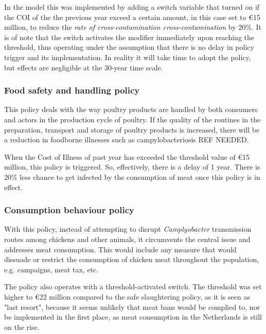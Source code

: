 In the model this was implemented by adding a switch variable that turned on if the COI of the the previous year exceed a certain amount, in this case set to \euro 15 million, to reduce the \textit{rate of cross-contamination cross-contamination} by 20\%. It is of note that the switch activates the modifier immediately upon reaching the threshold, thus operating under the assumption that there is no delay in policy trigger and its implementation. In reality it will take time to adopt the policy, but effects are negligible at the 30-year time scale.

\subsubsection{Food safety and handling policy}
This policy deals with the way poultry products are handled by both consumers and actors in the production cycle of poultry. If the quality of the routines in the preparation, transport and storage of poultry products is increased, there will be a reduction in foodborne illnesses such as campylobacteriosis REF NEEDED.

When the Cost of Illness of past year has exceeded the threshold value of \euro 15 million, this policy is triggered. So, effectively, there is a delay of 1 year. There is 20\% less chance to get infected by the consumption of meat once this policy is in effect.

\subsubsection{Consumption behaviour policy}
With this policy, instead of attempting to disrupt \textit{Camplyobacter} transmission routes among chickens and other animals, it circumvents the central issue and addresses meat consumption. This would include any measure that would dissuade or restrict the consumption of chicken meat throughout the population, e.g. campaigns, meat tax, etc.

The policy also operates with a threshold-activated switch. The threshold was set higher to \euro 22 million compared to the safe slaughtering policy, as it is seen as "last resort", because it seems unlikely that meat bans would be complied to, nor be implemented in the first place, as meat consumption in the Netherlands is still on the rise.

